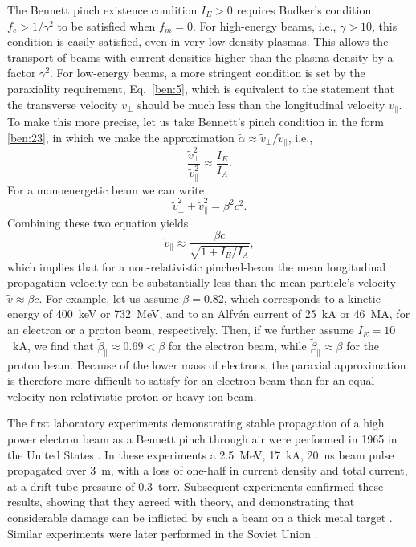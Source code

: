 \documentclass [12pt,a4paper,     ]{report} %
\begin{document}
	The Bennett pinch existence condition $I_E > 0$ requires Budker's condition $f_e > 1/\gamma^2$ to be satisfied when $f_m=0$.  For high-energy beams, i.e., $\gamma > 10$, this condition is easily satisfied, even in very low density plasmas.  This allows the transport of beams with current densities higher than the plasma density by a factor $\gamma^2$.  For low-energy beams, a more stringent condition is set by the paraxiality requirement, Eq.~\eqref{ben:5}, which is equivalent to the statement that the transverse velocity $v_{\perp}$ should be much less than the longitudinal velocity $v_{\|}$.  To make this more precise, let us take Bennett's pinch condition in the form \eqref{ben:23}, in which we make the approximation $\tilde{\alpha} \approx \tilde{v}_{\perp} / \tilde{v}_{\|}$, i.e.,
%
\begin{equation}\label{ben:27} %
      \frac{\tilde{v}_{\perp}^2}{\tilde{v}_{\|}^2}  \approx \frac{I_E}{I_A}.
\end{equation}
%
For a monoenergetic beam we can write
%
\begin{equation}\label{ben:28} %
      \tilde{v}_{\perp}^2 + \tilde{v}_{\|}^2 = \beta^2 c^2.
\end{equation}
%
Combining these two equation yields
%
\begin{equation}\label{ben:29} %
      \tilde{v}_{\|} \approx \frac{\beta c}{\sqrt{1+ I_E/I_A}},
\end{equation}
%
which implies that for a non-relativistic pinched-beam the mean longitudinal propagation velocity can be substantially less than the mean particle's velocity $\tilde{v} \approx \beta c$.  For example, let us assume $\beta = 0.82$, which corresponds to a kinetic energy of 400~keV or 732~MeV, and to an Alfv\'en current of 25~kA or 46~MA, for an electron or a proton beam, respectively.   Then, if we further assume $I_E = 10$~kA, we find that $\tilde{\beta}_{\|} \approx 0.69 < \beta$ for the electron beam, while $\tilde{\beta}_{\|} \approx \beta$ for the proton beam.  Because of the lower mass of electrons, the paraxial approximation is therefore more difficult to satisfy for an electron beam than for an equal velocity non-relativistic proton or heavy-ion beam.


   The first laboratory experiments demonstrating stable propagation of a high power electron beam as a Bennett pinch through air were performed in 1965 in the United States \cite{GRAYB1966-}.  In these experiments  a 2.5~MeV, 17~kA, 20~ns beam pulse propagated over 3~m, with a loss of one-half in current density and total current, at a drift-tube pressure of 0.3~torr.  Subsequent experiments confirmed these results, showing that they agreed with theory, and demonstrating that considerable damage can be inflicted by such a beam on a thick metal target \cite[Fig.3]{ROBER1968-}.  Similar experiments were later performed in the Soviet Union \cite{RUDAK1972-, WALLI1975-}. 
\end{document}
